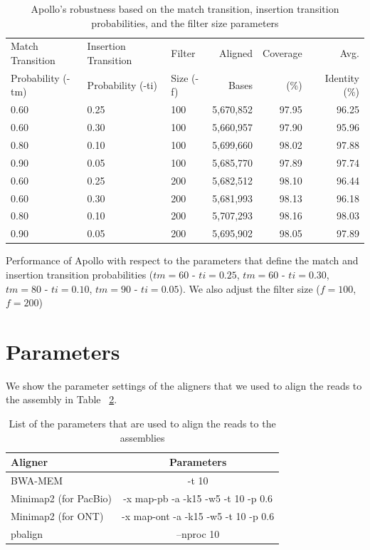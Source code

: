 \documentclass[a4paper]{article}
\begin{document}
\begin{table}[htb]
\begin{center}
\caption{Apollo's robustness based on the match transition, insertion transition probabilities, and the filter size parameters}
\label{supptab:transition}
\begin{tabular}{|l|l|l|rrr|}
\hline Match Transition & Insertion Transition & Filter & Aligned & Coverage & Avg.\\
Probability (-tm) & Probability (-ti) & Size (-f) & Bases & (\%) & Identity (\%) \\\hline
0.60  & 0.25 & 100 & 5,670,852 & 97.95 & 96.25 \\%
0.60  & 0.30 & 100 & 5,660,957 & 97.90 & 95.96 \\%
0.80  & 0.10 & 100 & 5,699,660 & 98.02 & 97.88 \\%
0.90  & 0.05 & 100 & 5,685,770 & 97.89 & 97.74 \\%
0.60  & 0.25 & 200 & 5,682,512 & 98.10 & 96.44 \\%
0.60  & 0.30 & 200 & 5,681,993 & 98.13 & 96.18 \\%
0.80  & 0.10 & 200 & 5,707,293 & 98.16 & 98.03 \\%
0.90  & 0.05 & 200 & 5,695,902 & 98.05 & 97.89 \\\hline
\end{tabular}
\end{center}
{\small Performance of Apollo with respect to the parameters that define the match and insertion transition probabilities ($tm=60$ - $ti=0.25$, $tm=60$ - $ti=0.30$, $tm=80$ - $ti=0.10$, $tm=90$ - $ti=0.05$). We also adjust the filter size ($f=100$, $f=200$)}
\end{table}

\clearpage

\section{Parameters}

We show the parameter settings of the aligners that we used to align the reads to the assembly in Table ~\ref{supptab:aligner-params}.

\begin{table}[htb]
\begin{center}
\caption{List of the parameters that are used to align the reads to the assemblies}
\label{supptab:aligner-params}
\begin{tabular}{|l|c|}
\hline Aligner &  Parameters \\\hline
BWA-MEM & -t 10\\\hline
Minimap2 (for PacBio) & -x map-pb -a -k15 -w5 -t 10 -p 0.6\\\hline
Minimap2 (for ONT) & -x map-ont -a -k15 -w5 -t 10 -p 0.6\\\hline
pbalign & --nproc 10 \\\hline
\end{tabular}
\end{center}
\end{table}

\clearpage



\end{document}
